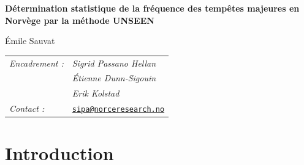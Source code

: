 \documentclass[a4paper, 10pt]{article}
\begin{document}




    \thispagestyle{empty}


    \begin{minipage}{0.9\textwidth}
        \centering
        \textbf{\huge Détermination statistique de la fréquence des tempêtes majeures en Norvège par la méthode UNSEEN}
        \vspace{4cm}
    \end{minipage}
    
    \vspace{0.5cm}
    
    \begin{center}
        {\large Émile Sauvat \vspace{10pt} \\ 
        \begin{table}[htbp]
            \centering
            \begin{tabular}{ll}
                \textit{Encadrement :} & \textit{Sigrid Passano Hellan} \\
                & \textit{Étienne Dunn-Sigouin} \\
                & \textit{Erik Kolstad} \\
                \textit{Contact :} & \href{mailto:sipa@norceresearch.no}{\texttt{sipa@norceresearch.no}}
            \end{tabular}
        \end{table}
        }
    \end{center}
    
    \newpage
        
        \setcounter{tocdepth}{3}
    \tableofcontents   
        
    \listoffigures 
    
    \section*{Introduction}


    
\end{document}
